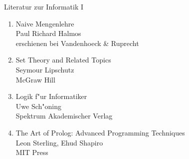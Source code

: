 \documentclass{slides}
\begin{document}
\begin{center}
  Literatur zur Informatik I
\end{center}
\vspace*{0.5cm}

\footnotesize
\begin{enumerate}
\item Naive Mengenlehre \\[0.3cm]
      Paul Richard Halmos \\[0.3cm]
      erschienen bei Vandenhoeck \& Ruprecht
 
\item Set Theory and Related Topics \\[0.3cm]
      Seymour Lipschutz \\[0.3cm]
      McGraw Hill

\item Logik f"ur Informatiker \\[0.3cm]
      Uwe Sch"oning \\[0.3cm]
      Spektrum Akademischer Verlag

\item The Art of Prolog: Advanced Programming Techniques \\[0.3cm]
      Leon Sterling, Ehud Shapiro \\[0.3cm]
      MIT Press
\end{enumerate}

\vspace*{\fill}
\tiny
\end{document}
